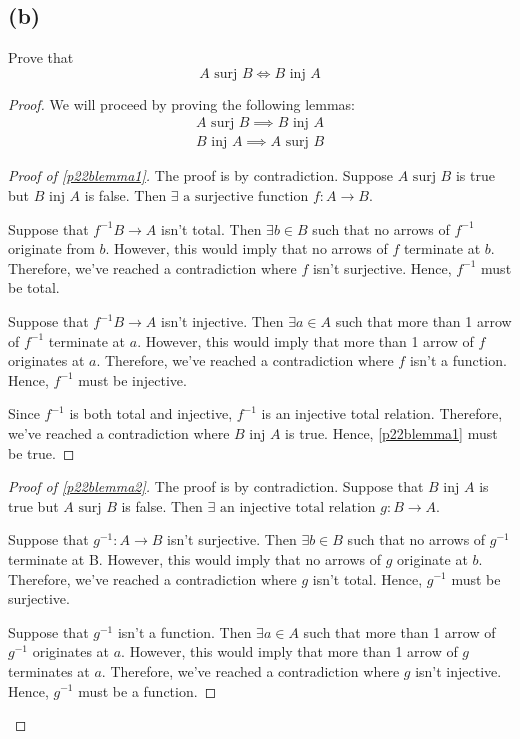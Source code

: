 \documentclass{article}
\newcommand{\surj}{\text{ surj }}
\newcommand{\inj}{\text{ inj }}
\newenvironment{subproof}[1][\proofname]{%
	\renewcommand{\qedsymbol}{$\blacksquare$}%
	\begin{proof}[#1]%
	}{%
	\end{proof}%
}
\begin{document}
\subsection{(b)}
Prove that
\begin{equation}\label{p22bclaim}
	A \surj B \iff B \inj A
\end{equation}
\begin{proof}
	We will proceed by proving the following lemmas:
	\begin{align}
		\label{p22blemma1} A \surj B \implies B \inj A \\
		\label{p22blemma2} B \inj A \implies A \surj B
	\end{align}
	\begin{subproof}[Proof of \eqref{p22blemma1}]
		The proof is by contradiction. Suppose $A \surj B$ is true but $B \inj A$ is false.
		Then $\exists \text{ a surjective function } f : A \rightarrow B$.

		Suppose that $f^{-1} B \rightarrow A$ isn't total. Then $\exists b \in B$ such that no arrows of $f^{-1}$ originate from $b$. However, this would imply that no arrows of $f$ terminate at $b$.  Therefore, we've reached a contradiction where $f$ isn't surjective. Hence, $f^{-1}$ must be total.

		Suppose that $f^{-1} B \rightarrow A$ isn't injective. Then $\exists a \in A$ such that more than 1 arrow of $f^{-1}$ terminate at $a$. However, this would imply that more than 1 arrow of $f$ originates at $a$. Therefore, we've reached a contradiction where $f$ isn't a function. Hence, $f^{-1}$ must be injective.

		Since $f^{-1}$ is both total and injective, $f^{-1}$ is an injective total relation. Therefore, we've reached a contradiction where $B \inj A$ is true. Hence, \eqref{p22blemma1} must be true.
	\end{subproof}

	\begin{subproof}[Proof of \eqref{p22blemma2}]
		The proof is by contradiction. Suppose that $B \inj A$ is true but $A \surj B$ is false. Then $\exists \text{ an injective total relation } g : B \rightarrow A$.

		Suppose that $g^{-1} : A \rightarrow B$ isn't surjective. Then $\exists b \in B$ such that no arrows of $g^{-1}$ terminate at B. However, this would imply that no arrows of $g$ originate at $b$. Therefore, we've reached a contradiction where $g$ isn't total. Hence, $g^{-1}$ must be surjective.

		Suppose that $g^{-1}$ isn't a function. Then $\exists a \in A$ such that more than 1 arrow of $g^{-1}$ originates at $a$. However, this would imply that more than 1 arrow of $g$ terminates at $a$. Therefore, we've reached a contradiction where $g$ isn't injective. Hence, $g^{-1}$ must be a function.


\end{subproof}
\end{proof}
\end{document}
